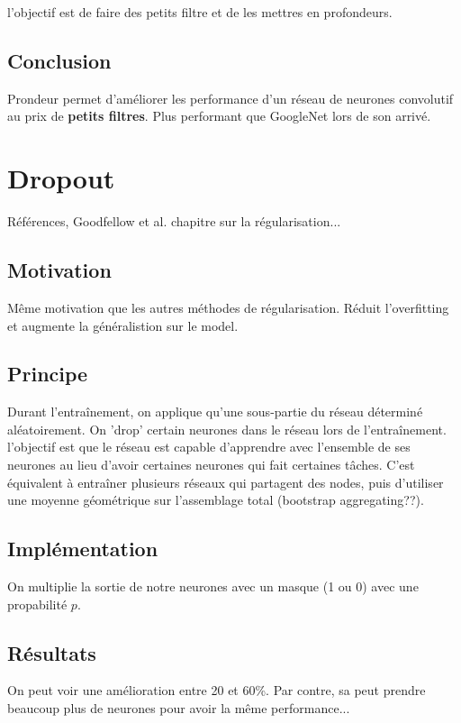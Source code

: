 \documentclass[oneside]{book}
\begin{document}
l'objectif est de faire des petits filtre et de les mettres en profondeurs.\\

\subsection{Conclusion}
Prondeur permet d'améliorer les performance d'un réseau de neurones convolutif au prix de \textbf{petits filtres}. Plus performant que GoogleNet lors de son arrivé.

\section{Dropout}
Références, Goodfellow et al. chapitre sur la régularisation...\\

\subsection{Motivation}
Même motivation que les autres méthodes de régularisation. Réduit l'overfitting et augmente la généralistion sur le model.\\

\subsection{Principe}
Durant l'entraînement, on applique qu'une sous-partie du réseau déterminé aléatoirement. On 'drop' certain neurones dans le réseau lors de l'entraînement. l'objectif est que le réseau est capable d'apprendre avec l'ensemble de ses neurones au lieu d'avoir certaines neurones qui fait certaines tâches. C'est équivalent à entraîner plusieurs réseaux qui partagent des nodes, puis d'utiliser une moyenne géométrique sur l'assemblage total (bootstrap aggregating??).\\

\subsection{Implémentation}
On multiplie la sortie de notre neurones avec un masque (1 ou 0) avec une propabilité $p$.\\


\subsection{Résultats} 
On peut voir une amélioration entre 20 et 60\%. Par contre, sa peut prendre beaucoup plus de neurones pour avoir la même performance... \\
\end{document}
